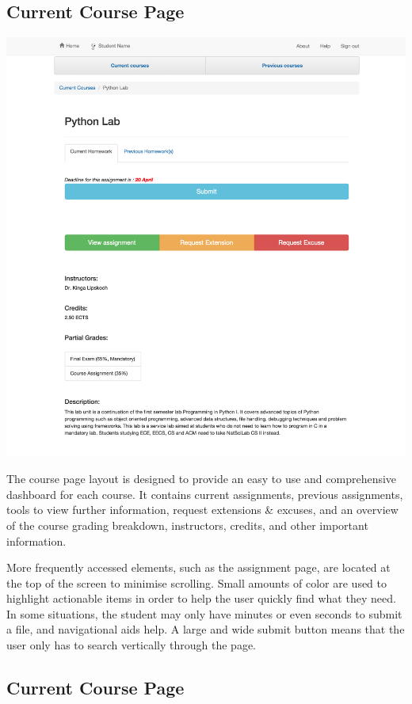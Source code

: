 \subsection{Current Course Page}

\includegraphics[width=\textwidth]{screenshots/PythonLab.png}

The course page layout is designed to provide an easy to use and comprehensive dashboard for each course. It contains current assignments, previous assignments, tools to view further information, request extensions \& excuses, and an overview of the course grading breakdown, instructors, credits, and other important information. 

More frequently accessed elements, such as the assignment page, are located at the top of the screen to minimise scrolling. Small amounts of color are used to highlight actionable items in order to help the user quickly find what they need. In some situations, the student may only have minutes or even seconds to submit a file, and navigational aids help. A large and wide submit button means that the user only has to search vertically through the page.

\subsection{Current Course Page}

